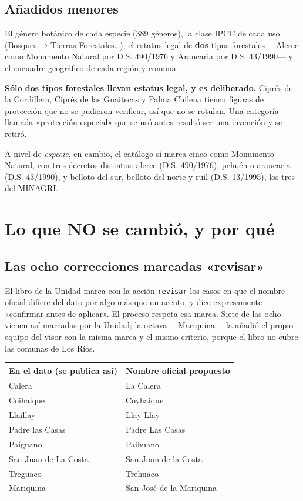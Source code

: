 \documentclass[11pt,a4paper]{report}
\newcommand{\campo}[1]{\textcolor{conaf}{\textbf{#1}}}
\newcommand{\orig}[1]{\texttt{\small #1}}
\begin{document}
\section{Añadidos menores}

El género botánico de cada especie (389 géneros), la clase IPCC de cada uso
(Bosques → Tierras Forestales…), el estatus legal de \campo{dos} tipos
forestales —Alerce como Monumento Natural por D.S. 490/1976 y Araucaria por
D.S. 43/1990— y el encuadre geográfico de cada región y comuna.

\begin{nota}
\campo{Sólo dos tipos forestales llevan estatus legal, y es deliberado.} Ciprés
de la Cordillera, Ciprés de las Guaitecas y Palma Chilena tienen figuras de
protección que no se pudieron verificar, así que no se rotulan. Una categoría
llamada «protección especial» que se usó antes resultó ser una invención y se
retiró.

A nivel de \emph{especie}, en cambio, el catálogo sí marca cinco como Monumento
Natural, con tres decretos distintos: alerce (D.S. 490/1976), pehuén o araucaria
(D.S. 43/1990), y belloto del sur, belloto del norte y ruil (D.S. 13/1995), los
tres del MINAGRI.
\end{nota}

\chapter{Lo que NO se cambió, y por qué}

\section{Las ocho correcciones marcadas «revisar»}

El libro de la Unidad marca con la acción \orig{revisar} los casos en que el
nombre oficial difiere del dato por algo más que un acento, y dice expresamente
«confirmar antes de aplicar». El proceso respeta esa marca. Siete de las ocho
vienen así marcadas por la Unidad; la octava —Mariquina— la añadió el propio
equipo del visor con la misma marca y el mismo criterio, porque el libro no
cubre las comunas de Los Ríos.

\begin{center}
\begin{tabular}{@{}L{5.2cm} L{5.2cm}@{}}
\toprule
\textbf{En el dato (se publica así)} & \textbf{Nombre oficial propuesto}\\
\midrule
Calera & La Calera\\
Coihaique & Coyhaique\\
Llaillay & Llay-Llay\\
Padre las Casas & Padre Las Casas\\
Paiguano & Paihuano\\
San Juan de La Costa & San Juan de la Costa\\
Treguaco & Trehuaco\\
Mariquina & San José de la Mariquina\\
\bottomrule
\end{tabular}
\end{center}
\end{document}
